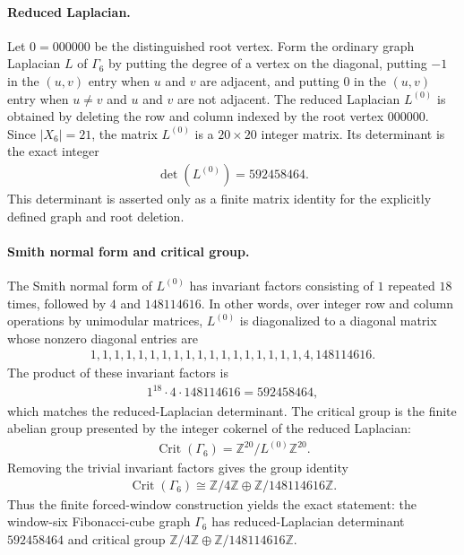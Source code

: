 \paragraph{Reduced Laplacian.}
Let $0=000000$ be the distinguished root vertex. Form the ordinary graph Laplacian $L$ of $\Gamma_6$ by putting the degree of a vertex on the diagonal, putting $-1$ in the $(u,v)$ entry when $u$ and $v$ are adjacent, and putting $0$ in the $(u,v)$ entry when $u\ne v$ and $u$ and $v$ are not adjacent. The reduced Laplacian $L^{(0)}$ is obtained by deleting the row and column indexed by the root vertex $000000$. Since $|X_6|=21$, the matrix $L^{(0)}$ is a $20\times 20$ integer matrix. Its determinant is the exact integer
$$
\begin{aligned}
\det(L^{(0)})=592458464.
\end{aligned}
$$
This determinant is asserted only as a finite matrix identity for the explicitly defined graph and root deletion.

\paragraph{Smith normal form and critical group.}
The Smith normal form of $L^{(0)}$ has invariant factors consisting of $1$ repeated $18$ times, followed by $4$ and $148114616$. In other words, over integer row and column operations by unimodular matrices, $L^{(0)}$ is diagonalized to a diagonal matrix whose nonzero diagonal entries are
$$
\begin{aligned}
1,1,1,1,1,1,1,1,1,1,1,1,1,1,1,1,1,1,4,148114616.
\end{aligned}
$$
The product of these invariant factors is
$$
\begin{aligned}
1^{18}\cdot 4\cdot 148114616=592458464,
\end{aligned}
$$
which matches the reduced-Laplacian determinant. The critical group is the finite abelian group presented by the integer cokernel of the reduced Laplacian:
$$
\begin{aligned}
\operatorname{Crit}(\Gamma_6)=\mathbb{Z}^{20}/L^{(0)}\mathbb{Z}^{20}.
\end{aligned}
$$
Removing the trivial invariant factors gives the group identity
$$
\begin{aligned}
\operatorname{Crit}(\Gamma_6)\cong \mathbb{Z}/4\mathbb{Z}\oplus \mathbb{Z}/148114616\mathbb{Z}.
\end{aligned}
$$
Thus the finite forced-window construction yields the exact statement: the window-six Fibonacci-cube graph $\Gamma_6$ has reduced-Laplacian determinant $592458464$ and critical group $\mathbb{Z}/4\mathbb{Z}\oplus \mathbb{Z}/148114616\mathbb{Z}$.

